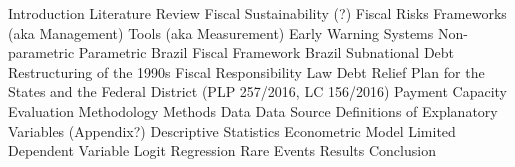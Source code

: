 \documentclass[12pt]{article}
\begin{document}
\begin{outline}
\1[I)] Introduction
\1[II)] Literature Review
    \2 Fiscal Sustainability (?)
    \2 Fiscal Risks
        \3 Frameworks (aka Management)
        \3 Tools (aka Measurement)
    \2 Early Warning Systems
        \3 Non-parametric
        \3 Parametric
    \2 Brazil Fiscal Framework
        \3 Brazil Subnational Debt Restructuring of the 1990s
        \3 Fiscal Responsibility Law
         Debt Relief Plan for the States and the Federal District (PLP 257/2016, LC 156/2016)
        \3 Payment Capacity Evaluation Methodology
\1[III)] Methods
    \2[III.1)] Data
        \3 Data Source
        \3 Definitions of Explanatory Variables (Appendix?)
        \3 Descriptive Statistics
    \2[III.2)] Econometric Model
        \3 Limited Dependent Variable
        \3 Logit Regression
        \3 Rare Events
\1[IV)] Results
\1[V)] Conclusion
\end{outline}
\end{document}
